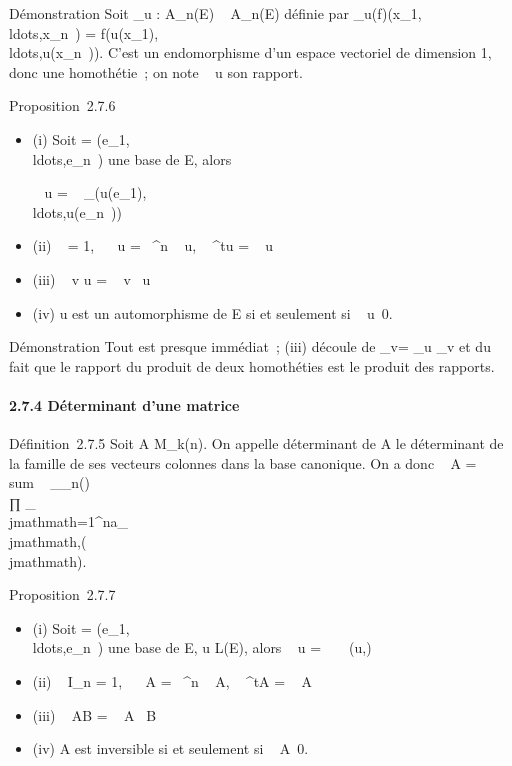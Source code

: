 \documentclass[]{article}
\begin{document}
Démonstration Soit \phi_u : A_n(E) \rightarrow~ A_n(E)
définie par
\phi_u(f)(x_1,\\ldots,x_n~)
=
f(u(x_1),\\ldots,u(x_n~)).
C'est un endomorphisme d'un espace vectoriel de dimension 1, donc une
homothétie~; on note
~ u son rapport.

Proposition~2.7.6

\begin{itemize}
\item
  (i) Soit  =
  (e_1,\\ldots,e_n~)
  une base de E, alors

  ~ u
  = ~
  _(u(e_1),\\ldots,u(e_n~))
\item
  (ii) ~
  \mathrmId = 1,
  ~ \lambda~u =
  \lambda~^n ~
  u, ~
  ^tu = ~
  u
\item
  (iii) ~ v \cdot u
  = ~
  v~ u
\item
  (iv) u est un automorphisme de E si et seulement si
  ~
  u\neq~0.
\end{itemize}

Démonstration Tout est presque immédiat~; (iii) découle de
\phi_v\cdotu = \phi_u \cdot \phi_v et du fait que le rapport
du produit de deux homothéties est le produit des rapports.

\paragraph{2.7.4 Déterminant d'une matrice}

Définition~2.7.5 Soit A \in M_k(n). On appelle déterminant de A
le déterminant de la famille de ses vecteurs colonnes dans la base
canonique. On a donc
~ A
= \\sum ~
_\sigma\inS_n\epsilon(\sigma)\\∏
 _\\jmathmath=1^na_\\jmathmath,\sigma(\\jmathmath).

Proposition~2.7.7

\begin{itemize}
\itemsep1pt\parskip0pt
\item
  (i) Soit  =
  (e_1,\\ldots,e_n~)
  une base de E, u \in L(E), alors
  ~ u
  = ~
  \mathrmMat~ (u,)
\item
  (ii) ~
  I_n = 1,
  ~ \lambda~A =
  \lambda~^n ~
  A, ~
  ^tA = ~
  A
\item
  (iii) ~ AB
  = ~
  A~ B
\item
  (iv) A est inversible si et seulement si
  ~
  A\neq~0.
\end{itemize}
\end{document}
